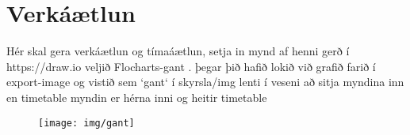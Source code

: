\section{Verkáætlun}
Hér skal gera verkáætlun og tímaáætlun, setja in mynd af henni gerð í https://draw.io veljið Flocharts-gant .  þegar þið hafið lokið við grafið farið í export-image og vistið sem `gant` í skyrsla/img
lenti í veseni að sitja myndina inn en timetable myndin er hérna inni og heitir timetable
\begin{figure}[h]
\texttt{[image: img/gant]}
\end{figure}

